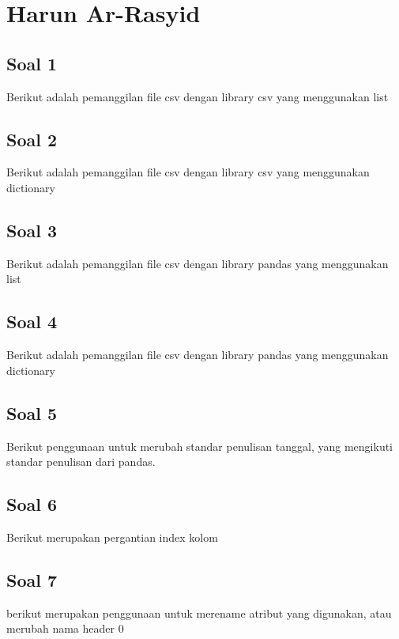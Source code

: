 \section{Harun Ar-Rasyid}
\subsection{Soal 1}
Berikut adalah pemanggilan file csv dengan library csv yang menggunakan list


\subsection{Soal 2}
Berikut adalah pemanggilan file csv dengan library csv yang menggunakan dictionary


\subsection{Soal 3}
Berikut adalah pemanggilan file csv dengan library pandas yang menggunakan list


\subsection{Soal 4}
Berikut adalah pemanggilan file csv dengan library pandas yang menggunakan dictionary


\subsection{Soal 5}
Berikut penggunaan untuk merubah standar penulisan tanggal, yang mengikuti standar penulisan dari pandas.


\subsection{Soal 6}
Berikut merupakan pergantian index kolom


\subsection{Soal 7}
berikut merupakan penggunaan untuk merename atribut yang digunakan, atau merubah nama header 0



